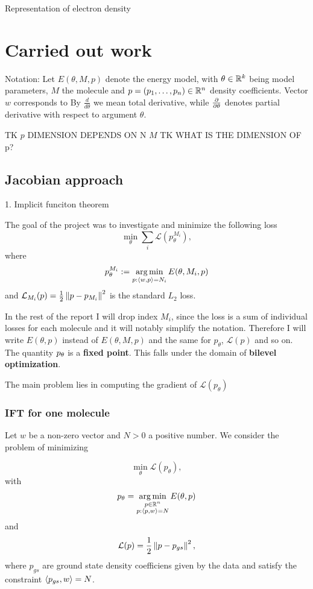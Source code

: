 \documentclass[a4paper,10pt]{report}
\begin{document}
Representation of electron density
\section{Carried out work}
Notation: Let $E(\theta, M ,p)$ denote the energy model, with $\theta \in \mathbb{R}^k$ being model parameters, $M$ the molecule and $p=(p_1, \ldots ,p_n )\in \mathbb{R}^n$ density coefficients. Vector $w$ corresponds to
By $\frac{d}{d\theta}$ we mean total derivative, while $\frac{\partial }{\partial \theta}$ denotes partial derivative with respect to argument $\theta$.

TK $p$ DIMENSION DEPENDS ON N $M$
TK WHAT IS THE DIMENSION OF p?

 \subsection{Jacobian approach}
1. Implicit funciton theorem

The goal of the project was to investigate and minimize the following loss
\begin{equation}
 \min_\theta \sum_i \mathcal{L}(p_{\theta}^{M_i}),
\end{equation}
where
\begin{equation}
  p_\theta^{M_i}:=\operatorname*{arg\,min}_{p : \langle w, p \rangle=N_i} E(\theta,M_i,p)
\end{equation}
and $\mathcal{L}_{M_i}(p) = \frac{1}{2}\left\|p-p_{M_i}\right\|^2$ is the standard $L_2$ loss.

In the rest of the report I will drop index $M_i$, since the loss is a sum of individual losses for each molecule and it will notably simplify the notation.
Therefore I will write $E(\theta,p)$ instead of $E(\theta,M,p)$ and the same for $p_\theta$, $\mathcal{L}(p)$ and so on.
The quantity $p_\theta$ is a \textbf{fixed point}.
This falls under the domain of \textbf{bilevel optimization}.

The main problem lies in computing the gradient of $\mathcal{L}(p_\theta)$


\subsubsection{IFT for one molecule}
Let $w$ be a non-zero vector and $N>0$ a positive number.
We consider the problem of minimizing

\begin{equation}
 \min_\theta \mathcal{L}(p_\theta),
\end{equation}
with
\begin{equation}
p_\theta = \operatorname*{arg\,min}_{\substack{p \in \mathbb{R}^n \\ p: \langle p, w \rangle=N }} E(\theta, p)
\end{equation}
and
\begin{equation}
 \mathcal{L}(p) = \frac{1}{2} \left\|p-p_{gs}\right\|^2,
\end{equation}
where $p_{gs}$ are ground state density coefficiens given by the data and satisfy the constraint $\langle p_{gs}, w \rangle = N$.
\end{document}
